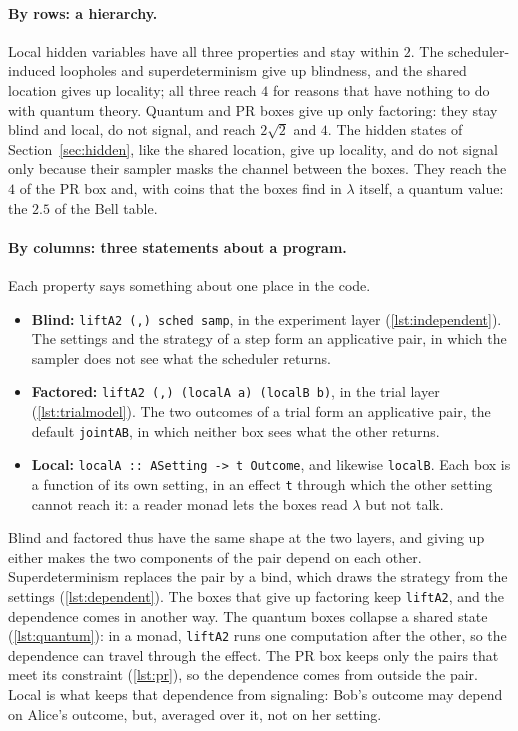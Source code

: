 \documentclass[11pt]{article}
\newcommand{\hs}{\lstinline[style=hask,basicstyle=\ttfamily,frame=none]}
\begin{document}
\paragraph{By rows: a hierarchy.} Local hidden variables have all three properties and stay within $2$. The scheduler-induced loopholes and superdeterminism give up blindness, and the shared location gives up locality; all three reach $4$ for reasons that have nothing to do with quantum theory. Quantum and PR boxes give up only factoring: they stay blind and local, do not signal, and reach $2\sqrt2$ and $4$. The hidden states of Section~\ref{sec:hidden}, like the shared location, give up locality, and do not signal only because their sampler masks the channel between the boxes. They reach the $4$ of the PR box and, with coins that the boxes find in $\lambda$ itself, a quantum value: the $2.5$ of the Bell table.

\paragraph{By columns: three statements about a program.} Each property says something about one place in the code.
\begin{itemize}
\item \textbf{Blind:} \hs|liftA2 (,) sched samp|, in the experiment layer (\ref{lst:independent}). The settings and the strategy of a step form an applicative pair, in which the sampler does not see what the scheduler returns.
\item \textbf{Factored:} \hs|liftA2 (,) (localA a) (localB b)|, in the trial layer (\ref{lst:trialmodel}). The two outcomes of a trial form an applicative pair, the default \hs|jointAB|, in which neither box sees what the other returns.
\item \textbf{Local:} \hs|localA :: ASetting -> t Outcome|, and likewise \hs|localB|. Each box is a function of its own setting, in an effect \hs|t| through which the other setting cannot reach it: a reader monad lets the boxes read $\lambda$ but not talk.
\end{itemize}
Blind and factored thus have the same shape at the two layers, and giving up either makes the two components of the pair depend on each other. Superdeterminism replaces the pair by a bind, which draws the strategy from the settings (\ref{lst:dependent}). The boxes that give up factoring keep \hs|liftA2|, and the dependence comes in another way. The quantum boxes collapse a shared state (\ref{lst:quantum}): in a monad, \hs|liftA2| runs one computation after the other, so the dependence can travel through the effect. The PR box keeps only the pairs that meet its constraint (\ref{lst:pr}), so the dependence comes from outside the pair. Local is what keeps that dependence from signaling: Bob's outcome may depend on Alice's outcome, but, averaged over it, not on her setting.
\end{document}
